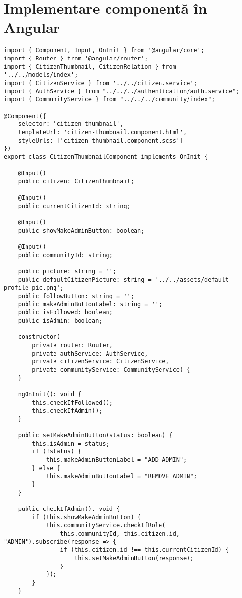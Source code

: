 \section{Implementare componentă în Angular}
\begin {lstlisting}
import { Component, Input, OnInit } from '@angular/core';
import { Router } from '@angular/router';
import { CitizenThumbnail, CitizenRelation } from '../../models/index';
import { CitizenService } from '../../citizen.service';
import { AuthService } from "../../../authentication/auth.service";
import { CommunityService } from "../../../community/index";

@Component({
    selector: 'citizen-thumbnail',
    templateUrl: 'citizen-thumbnail.component.html',
    styleUrls: ['citizen-thumbnail.component.scss']
})
export class CitizenThumbnailComponent implements OnInit {

    @Input()
    public citizen: CitizenThumbnail;

    @Input()
    public currentCitizenId: string;

    @Input()
    public showMakeAdminButton: boolean;

    @Input()
    public communityId: string;

    public picture: string = '';
    public defaultCitizenPicture: string = '../../assets/default-profile-pic.png';
    public followButton: string = '';
    public makeAdminButtonLabel: string = '';
    public isFollowed: boolean;
    public isAdmin: boolean;

    constructor(
        private router: Router,
        private authService: AuthService,
        private citizenService: CitizenService,
        private communityService: CommunityService) {
    }

    ngOnInit(): void {
        this.checkIfFollowed();
        this.checkIfAdmin();
    }

    public setMakeAdminButton(status: boolean) {
        this.isAdmin = status;
        if (!status) {
            this.makeAdminButtonLabel = "ADD ADMIN";
        } else {
            this.makeAdminButtonLabel = "REMOVE ADMIN";
        }
    }

    public checkIfAdmin(): void {
        if (this.showMakeAdminButton) {
            this.communityService.checkIfRole(
                this.communityId, this.citizen.id, "ADMIN").subscribe(response => {
                if (this.citizen.id !== this.currentCitizenId) {
                    this.setMakeAdminButton(response);
                }
            });
        }
    }


\end{lstlisting}
